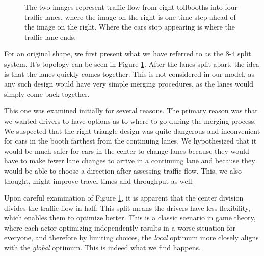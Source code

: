 \documentclass[a4paper, 11pt]{article}
\begin{document}
\begin{figure}[H]
\begin{center}
\begin{tabular}{c c}
\end{tabular}
\end{center}
\caption{The two images represent traffic flow from eight tollbooths into four traffic lanes, where the image on the right is one time step ahead of the image on the right. Where the cars stop appearing is where the traffic lane ends. }
\label{fig:48_split}
\end{figure}

For an original shape, we first present what we have referred to as the 8-4 split system. It's topology can be seen in Figure  \ref{fig:48_split}. After the lanes split apart, the idea is that the lanes quickly comes together. This is not considered in our model, as any such design would have very simple merging procedures, as the lanes would simply come back together. 



This one was examined initially for several reasons. The primary reason was that we wanted drivers to have options as to where to go during the merging process. We suspected that the right triangle design was quite dangerous and inconvenient for cars in the booth farthest from the continuing lanes. We hypothesized that it would be much safer for cars in the center to change lanes because they would have to make fewer lane changes to arrive in a continuing lane and because they would be able to choose a direction after assessing traffic flow. This, we also thought, might improve travel times and throughput as well. 

Upon careful examination of Figure \ref{fig:48_split}, it is apparent that the center division divides the traffic flow in half. This split means the drivers have less flexibility, which enables them to optimize better. This is a classic scenario in game theory, where each actor optimizing independently results in a worse situation for everyone, and therefore by limiting choices, the \textit{local} optimum more closely aligns with the \textit{global} optimum. This is indeed what we find happens. 
\end{document}
